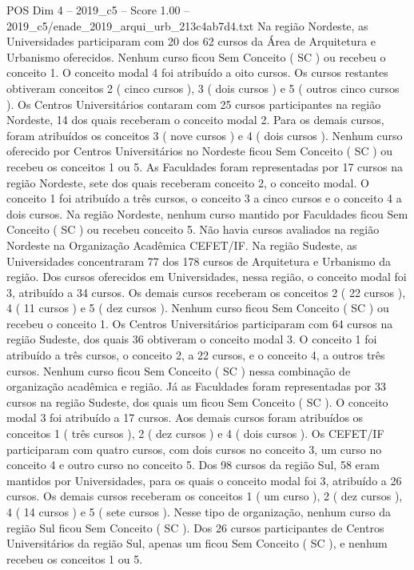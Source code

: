 \begin{textsample}{POS Dim 4 – 2019\_c5 – Score 1.00 – 2019\_c5/enade\_2019\_arqui\_urb\_213c4ab7d4.txt}
Na região Nordeste, as Universidades participaram com 20 dos 62 cursos da Área de Arquitetura e Urbanismo oferecidos.
Nenhum curso ficou Sem Conceito ( SC ) ou recebeu o conceito 1.
O conceito modal 4 foi atribuído a oito cursos.
Os cursos restantes obtiveram conceitos 2 ( cinco cursos ), 3 ( dois cursos ) e 5 ( outros cinco cursos ).
Os Centros Universitários contaram com 25 cursos participantes na região Nordeste, 14 dos quais receberam o conceito modal 2.
Para os demais cursos, foram atribuídos os conceitos 3 ( nove cursos ) e 4 ( dois cursos ).
Nenhum curso oferecido por Centros Universitários no Nordeste ficou Sem Conceito ( SC ) ou recebeu os conceitos 1 ou 5.
As Faculdades foram representadas por 17 cursos na região Nordeste, sete dos quais receberam conceito 2, o conceito modal.
O conceito 1 foi atribuído a três cursos, o conceito 3 a cinco cursos e o conceito 4 a dois cursos.
Na região Nordeste, nenhum curso mantido por Faculdades ficou Sem Conceito ( SC ) ou recebeu conceito 5.
Não havia cursos avaliados na região Nordeste na Organização Acadêmica CEFET/IF.
Na região Sudeste, as Universidades concentraram 77 dos 178 cursos de Arquitetura e Urbanismo da região.
Dos cursos oferecidos em Universidades, nessa região, o conceito modal foi 3, atribuído a 34 cursos.
Os demais cursos receberam os conceitos 2 ( 22 cursos ), 4 ( 11 cursos ) e 5 ( dez cursos ).
Nenhum curso ficou Sem Conceito ( SC ) ou recebeu o conceito 1.
Os Centros Universitários participaram com 64 cursos na região Sudeste, dos quais 36 obtiveram o conceito modal 3.
O conceito 1 foi atribuído a três cursos, o conceito 2, a 22 cursos, e o conceito 4, a outros três cursos.
Nenhum curso ficou Sem Conceito ( SC ) nessa combinação de organização acadêmica e região.
Já as Faculdades foram representadas por 33 cursos na região Sudeste, dos quais um ficou Sem Conceito ( SC ).
O conceito modal 3 foi atribuído a 17 cursos.
Aos demais cursos foram atribuídos os conceitos 1 ( três cursos ), 2 ( dez cursos ) e 4 ( dois cursos ).
Os CEFET/IF participaram com quatro cursos, com dois cursos no conceito 3, um curso no conceito 4 e outro curso no conceito 5.
Dos 98 cursos da região Sul, 58 eram mantidos por Universidades, para os quais o conceito modal foi 3, atribuído a 26 cursos.
Os demais cursos receberam os conceitos 1 ( um curso ), 2 ( dez cursos ), 4 ( 14 cursos ) e 5 ( sete cursos ).
Nesse tipo de organização, nenhum curso da região Sul ficou Sem Conceito ( SC ).
Dos 26 cursos participantes de Centros Universitários da região Sul, apenas um ficou Sem Conceito ( SC ), e nenhum recebeu os conceitos 1 ou 5.

\end{textsample}
